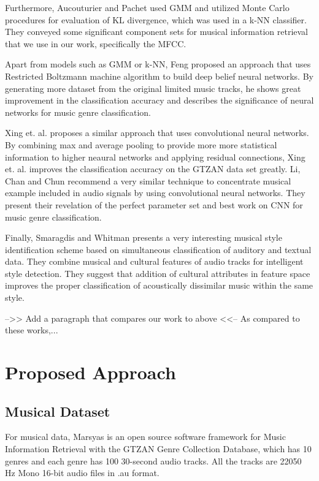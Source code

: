 Furthermore, Aucouturier and Pachet \cite{Pachet:2003} used GMM and utilized Monte Carlo procedures for evaluation of KL divergence, which was used in a k-NN classifier. They conveyed some significant component sets for musical information retrieval that we use in our work, specifically the MFCC. 

Apart from models such as GMM or k-NN, Feng \cite{Feng:2016} proposed an approach that uses Restricted Boltzmann machine algorithm to build deep belief neural networks. By generating more dataset from the original limited music tracks, he shows great improvement in the classification accuracy and describes the significance of neural networks for music genre classification. 

Xing et. al. \cite{Xing:2016} proposes a similar approach that uses convolutional neural networks. By combining max and average pooling to provide more more statistical information to higher neaural networks and applying residual connections, Xing et. al. \cite{Xing:2016} improves the classification accuracy on the GTZAN data set greatly. Li, Chan and Chun \cite{Chun:2010} recommend a very similar technique to concentrate musical example included in audio signals by using convolutional neural networks. They present their revelation of the perfect parameter set and best work on CNN for music genre classification.

Finally, Smaragdis and Whitman \cite{Smaragdis:2002} presents a very interesting musical style identification scheme based on simultaneous classification of auditory and textual data. They combine musical and cultural features of audio tracks for intelligent style detection. They suggest that addition of cultural attributes in feature space improves the proper classification of acoustically dissimilar music within the same style.

-->> Add a paragraph that compares our work to above <<-- 
As compared to these works,...

\section{Proposed Approach}\label{sec:approach}
\subsection{Musical Dataset}
For musical data, Marsyas is an open source software framework for Music Information Retrieval with the GTZAN Genre Collection Database, which has 10 genres and each genre has 100 30-second audio tracks. All the tracks are 22050 Hz Mono 16-bit audio files in .au format. 

